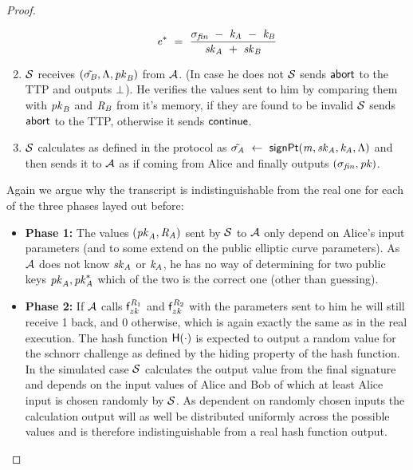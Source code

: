 \begin{proof}
\begin{enumerate}
\begin{gather*}
            \mathit{e}^* ~=~ \frac{\sigma_{\mathit{fin}} ~-~ \mathit{\mathit{k}_{\mathit{A}}} ~-~ \mathit{\mathit{k}_{\mathit{B}}}}{\mathit{sk}_{\mathit{A}} ~+~ \mathit{sk}_{\mathit{B}}}
        \end{gather*}
        \item $\mathcal{S}$ receives $(\tilde{\sigma_{\mathit{B}}}, \Lambda, \mathit{pk}_{\mathit{B}})$ from $\mathcal{A}$.
        (In case he does not $\mathcal{S}$ sends $\mathsf{abort}$ to the TTP and outputs $\bot$).
        He verifies the values sent to him by comparing them with $\mathit{pk}_{\mathit{B}}$ and $\mathit{R}_{\mathit{B}}$ from it's memory, if they are found to be invalid $\mathcal{S}$ sends $\mathsf{abort}$ to the TTP, otherwise it sends $\mathsf{continue}$.
        \item $\mathcal{S}$ calculates as defined in the protocol as $\tilde{\sigma_{\mathit{A}}} ~\leftarrow~ \mathsf{signPt}(\mathit{m}, \mathit{sk}_{\mathit{A}}, \mathit{\mathit{k}_{\mathit{A}}}, \Lambda)$ and then sends it to $\mathcal{A}$ as if coming from Alice and finally outputs $(\sigma_{\mathit{fin}}, \mathit{pk})$.
    \end{enumerate}
    Again we argue why the transcript is indistinguishable from the real one for each of the three phases layed out before:
    \begin{itemize}
        \item \textbf{Phase 1: } The values $(\mathit{pk}_{\mathit{A}}, \mathit{R}_{\mathit{A}})$ sent by $\mathcal{S}$ to $\mathcal{A}$ only depend on Alice's input parameters (and to some extend on the public elliptic curve parameters).
        As $\mathcal{A}$ does not know $\mathit{sk}_{\mathit{A}}$ or $\mathit{\mathit{k}_{\mathit{A}}}$, he has no way of determining for two public keys $\mathit{pk}_{\mathit{A}}, \mathit{pk}_{\mathit{A}}^*$ which of the two is the correct one (other than guessing).
        \item \textbf{Phase 2: } If $\mathcal{A}$ calls $\mathsf{f}^{\mathit{R}_1}_{zk}$ and $\mathsf{f}^{\mathit{R}_2}_{zk}$ with the parameters sent to him he will still receive 1 back, and 0 otherwise, which is again exactly the same as in the real execution.
        The hash function $\mathsf{H} (\cdot)$ is expected to output a random value for the schnorr challenge as defined by the hiding property of the hash function.
        In the simulated case $\mathcal{S}$ calculates the output value from the final signature and depends on the input values of Alice and Bob of which at least Alice input is chosen randomly by $\mathcal{S}$.
        As dependent on randomly chosen inputs the calculation output will as well be distributed uniformly across the possible values and is therefore indistinguishable from a real hash function output.

\end{itemize}
\end{proof}
